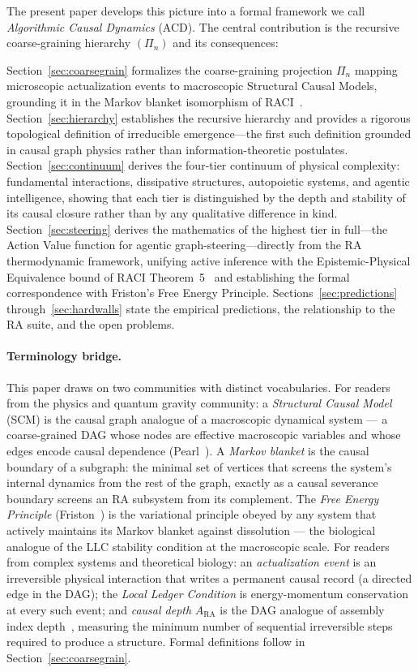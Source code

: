 \documentclass[11pt,a4paper]{article}
\theoremstyle{remark}
\begin{document}
The present paper develops this picture into a formal framework we call
\emph{Algorithmic Causal Dynamics} (ACD). The central contribution is the
recursive coarse-graining hierarchy $(\Pi_n)$ and its consequences:

Section~\ref{sec:coarsegrain} formalizes the coarse-graining projection $\Pi_n$
mapping microscopic actualization events to macroscopic Structural Causal Models,
grounding it in the Markov blanket isomorphism of RACI~\citep{Sandeman2026c}.
Section~\ref{sec:hierarchy} establishes the recursive hierarchy and provides a
rigorous topological definition of irreducible emergence---the first such
definition grounded in causal graph physics rather than information-theoretic
postulates. Section~\ref{sec:continuum} derives the four-tier continuum of
physical complexity: fundamental interactions, dissipative structures, autopoietic
systems, and agentic intelligence, showing that each tier is distinguished by the
depth and stability of its causal closure rather than by any qualitative difference
in kind. Section~\ref{sec:steering} derives the mathematics of the highest tier
in full---the Action Value function for agentic graph-steering---directly from
the RA thermodynamic framework, unifying active inference with the Epistemic-Physical
Equivalence bound of RACI Theorem~5~\citep{Sandeman2026c} and establishing the
formal correspondence with Friston's Free Energy Principle. Sections~\ref{sec:predictions}
through~\ref{sec:hardwalls} state the empirical predictions, the relationship to
the RA suite, and the open problems.

\paragraph{Terminology bridge.}
This paper draws on two communities with distinct vocabularies.  For readers
from the physics and quantum gravity community: a \emph{Structural Causal
Model} (SCM) is the causal graph analogue of a macroscopic dynamical system
--- a coarse-grained DAG whose nodes are effective macroscopic variables and
whose edges encode causal dependence (Pearl~\citep{Pearl2009}).  A
\emph{Markov blanket} is the causal boundary of a subgraph: the minimal
set of vertices that screens the system's internal dynamics from the rest of
the graph, exactly as a causal severance boundary screens an RA subsystem
from its complement.  The \emph{Free Energy Principle} (Friston~\citep{Friston2010})
is the variational principle obeyed by any system that actively maintains
its Markov blanket against dissolution --- the biological analogue of the
LLC stability condition at the macroscopic scale.  For readers from complex
systems and theoretical biology: an \emph{actualization event} is an
irreversible physical interaction that writes a permanent causal record (a
directed edge in the DAG); the \emph{Local Ledger Condition} is
energy-momentum conservation at every such event; and \emph{causal depth}
$A_{\mathrm{RA}}$ is the DAG analogue of assembly index depth~\citep{Murray2023},
measuring the minimum number of sequential irreversible steps required to
produce a structure.  Formal definitions follow in Section~\ref{sec:coarsegrain}.
\end{document}
